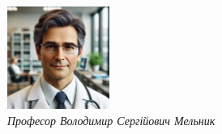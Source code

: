 \begin{flushright}
    \includegraphics[width=0.25\textwidth]{Illustrations/Preface/image2.png} \\
    \textit{Професор Володимир Сергійович Мельник}
\end{flushright}

